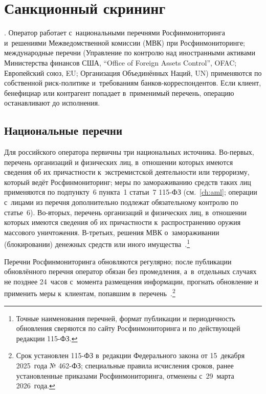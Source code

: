 
\chapter{Санкционный скрининг}\label{ch:sanctions}
. Оператор работает
с~национальными перечнями Росфинмониторинга и~решениями
Межведомственной комиссии (МВК) при Росфинмониторинге;
международные перечни (Управление по контролю над иностранными
активами Министерства финансов США, \enquote{Office of Foreign
Assets Control}, OFAC; Европейский союз, EU; Организация
Объединённых Наций, UN) применяются по собственной риск-политике
и~требованиям банков-корреспондентов. Если клиент, бенефициар
или контрагент попадает в~применимый перечень, операцию
останавливают до исполнения.

\section{Национальные перечни}\label{sec:sanctions-rf-lists}

Для российского оператора первичны три национальных источника.
Во-первых, перечень организаций и физических лиц, в~отношении
которых имеются сведения об их причастности к~экстремистской
деятельности или терроризму, который ведёт Росфинмониторинг;
меры по замораживанию средств таких лиц применяются по
подпункту~6 пункта~1 статьи~7 115-ФЗ (см.~\autoref{ch:aml}; операции
с~лицами из перечня дополнительно подлежат обязательному контролю
по статье~6). Во-вторых, перечень организаций и физических лиц,
в~отношении которых имеются сведения об их причастности
к~распространению оружия массового уничтожения. В-третьих,
решения МВК о~замораживании (блокировании) денежных средств
или иного имущества~\cite{rosfinmonitoring-lists,fz-115,cbr-mvk}.\footnote{Точные
наименования перечней, формат публикации и периодичность
обновления сверяются по сайту Росфинмониторинга и по
действующей редакции 115-ФЗ.}

Перечни Росфинмониторинга обновляются регулярно; после публикации
обновлённого перечня оператор обязан без промедления, а~в~отдельных
случаях не позднее 24~часов с~момента размещения информации,
прогнать обновление и применить меры к~клиентам, попавшим
в~перечень~\cite{rosfinmonitoring-lists,fz-115}.\footnote{Срок
установлен 115-ФЗ в~редакции Федерального закона от 15~декабря
2025~года № 462-ФЗ; специальные правила исчисления сроков,
ранее установленные приказами Росфинмониторинга, отменены
с~29~марта 2026~года.}

